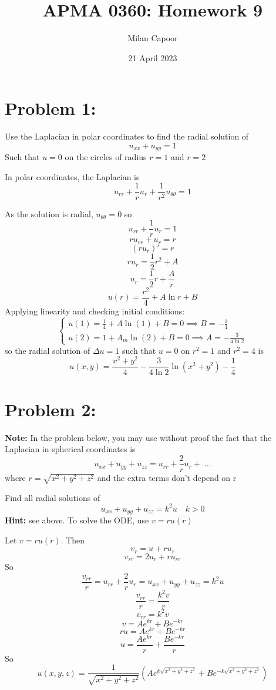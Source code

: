 \documentclass[12pt]{article}
\title{APMA 0360: Homework 9}
\author{Milan Capoor}
\date{21 April 2023 }
\begin{document}
\maketitle
\section*{Problem 1:}
Use the Laplacian in polar coordinates to find the radial solution of
\[u_{xx} + u_{yy} = 1\]
Such that $u = 0$ on the circles of radius $r = 1$ and $r = 2$

\color{blue}
In polar coordinates, the Laplacian is 
\[u_{rr} + \frac{1}{r}u_r + \frac{1}{r^2} u_{\theta \theta} = 1\] 

As the solution is radial, $u_{\theta \theta} = 0$ so 
\[u_{rr} + \frac{1}{r}u_r = 1\]
\[ru_{rr} + u_r = r\]
\[(ru_r)' = r\]
\[ru_r = \frac{1}{2}r^2 + A\]
\[u_r = \frac{1}{2}r + \frac{A}{r}\]
\[u(r) = \frac{r^2}{4} + A\ln r + B\]
Applying linearity and checking initial conditions:
\[\begin{cases}
    u(1) = \frac{1}{4} + A\ln(1) + B = 0 \implies  B = -\frac{1}{4}\\
    u(2) = 1 + A_m\ln(2) + B = 0 \implies A = -\frac{3}{4\ln 2}
\end{cases}\]
so the radial solution of $\Delta u = 1$ such that $u = 0$ on $r^2 = 1$ and $r^2 = 4$ is 
\[\boxed{u(x, y) = \frac{x^2 + y^2}{4} - \frac{3}{4\ln 2} \ln(x^2 + y^2) - \frac{1}{4}}\]

\color{black}
\pagebreak

\section*{Problem 2:} 
\textbf{Note:} In the problem below, you may use without proof the fact that the Laplacian in spherical coordinates is
\[u_{xx} + u_{yy} + u_{zz} = u_{rr} + \frac{2}{r} u_r + \; ...\]
where $r = \sqrt{x^2 + y^2 + z^2}$ and the extra terms don't depend on r 

Find all radial solutions of
\[u_{xx} + u_{yy} + u_{zz} = k^2u \quad k > 0\]
\textbf{Hint:} see above. To solve the ODE, use $v = ru(r)$

\color{blue}
Let $v = ru(r)$. Then 
\[v_r = u + ru_r\]
\[v_{rr} = 2u_r + ru_{rr}\]
So 
\[\frac{v_{rr}}{r} = u_{rr} + \frac{2}{r}u_r = u_{xx} + u_{yy} + u_{zz} = k^2 u\] 
\[\frac{v_{rr}}{r} = \frac{k^2v}{r}\]
\[v_{rr} = k^2 v\]
\[v = Ae^{kr} + Be^{-kr}\]
\[ru = Ae^{kr} + Be^{-kr}\]
\[u = \frac{Ae^{kr}}{r} + \frac{Be^{-kr}}{r}\]
So 
\[\boxed{u(x, y, z) = \frac{1}{\sqrt{x^2 + y^2 + z^2}}\left(Ae^{k\sqrt{x^2 + y^2 + z^2}} + Be^{-k\sqrt{x^2 +y^2 + z^2}}\right)}\]
\color{black}
\pagebreak
\end{document}
